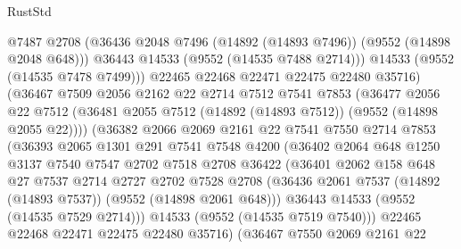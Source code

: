 \begin{lexlean}{RustStd}
\begin{coremodule}
                      @7487
                      @2708
                      (@36436 @2048 @7496 (@14892 (@14893 @7496)) (@9552 (@14898 @2048 @648)))
                      @36443
                      @14533
                      (@9552 (@14535 @7488 @2714)))
                    @14533
                    (@9552 (@14535 @7478 @7499)))
                  @22465
                  @22468
                  @22471
                  @22475
                  @22480
                  @35716)
                (@36467
                  @7509
                  @2056
                  @2162
                  @22
                  @2714
                  @7512
                  @7541
                  @7853
                  (@36477
                    @2056
                    @22
                    @7512
                    (@36481 @2055 @7512 (@14892 (@14893 @7512)) (@9552 (@14898 @2055 @22))))
                  (@36382
                    @2066
                    @2069
                    @2161
                    @22
                    @7541
                    @7550
                    @2714
                    @7853
                    (@36393
                      @2065
                      @1301
                      @291
                      @7541
                      @7548
                      @4200
                      (@36402
                        @2064
                        @648
                        @1250
                        @3137
                        @7540
                        @7547
                        @2702
                        @7518
                        @2708
                        @36422
                        (@36401
                          @2062
                          @158
                          @648
                          @27
                          @7537
                          @2714
                          @2727
                          @2702
                          @7528
                          @2708
                          (@36436 @2061 @7537 (@14892 (@14893 @7537)) (@9552 (@14898 @2061 @648)))
                          @36443
                          @14533
                          (@9552 (@14535 @7529 @2714)))
                        @14533
                        (@9552 (@14535 @7519 @7540)))
                      @22465
                      @22468
                      @22471
                      @22475
                      @22480
                      @35716)
                    (@36467
                      @7550
                      @2069
                      @2161
                      @22

\end{coremodule}
\end{lexlean}
